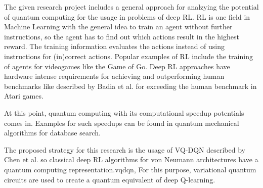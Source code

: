 The given research project includes a general approach for analzying the potential of quantum computing for the usage in problems of deep \ac{RL}. 
\ac{RL} is one field in Machine Learning with the general idea to train an agent without further instructions, so the agent has to find out which actions result in the highest reward. 
The training information evaluates the actions instead of using instructions for (in)correct actions.
Popular examples of \ac{RL} include the training of agents for videogames like the Game of Go.\autocite{rl}
Deep \ac{RL} approaches have hardware intense requirements for achieving and outperforming human benchmarks like described by Badia et al. for exceeding the human benchmark in Atari games.\autocite{atari}


At this point, quantum computing with its computational speedup potentials comes in.
Examples for such speedups can be found in quantum mechanical algorithms for database search\autocite{databasesearch}. 


The proposed strategy for this research is the usage of \ac{VQ-DQN} described by Chen et al. so classical deep \ac{RL} algorithms for von Neumann architectures have a quantum computing representation.\ac{vqdqn},
For this purpose, variational quantum circuits are used to create a quantum equivalent of deep Q-learning.%
